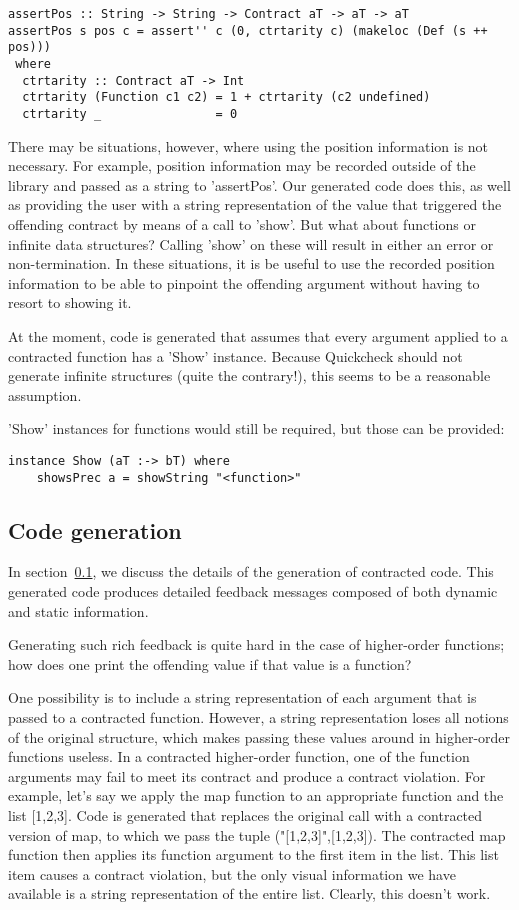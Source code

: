 \documentclass[10pt,a4paper]{article}
\begin{document}
\begin{lstlisting}
assertPos :: String -> String -> Contract aT -> aT -> aT
assertPos s pos c = assert'' c (0, ctrtarity c) (makeloc (Def (s ++ pos)))
 where
  ctrtarity :: Contract aT -> Int
  ctrtarity (Function c1 c2) = 1 + ctrtarity (c2 undefined)
  ctrtarity _                = 0
\end{lstlisting}

There may be situations, however, where using the position information is not necessary.
For example, position information may be recorded outside of the library and passed as a string to 'assertPos'.
Our generated code does this, as well as providing the user with a string representation of the value that triggered the offending contract by means of a call to 'show'.
But what about functions or infinite data structures? Calling 'show' on these will result in either an error or non-termination.
In these situations, it is be useful to use the recorded position information to be able to pinpoint the offending argument without having to resort to showing it.

At the moment, code is generated that assumes that every argument applied to a contracted function has a 'Show' instance. Because Quickcheck should not generate infinite structures (quite the contrary!), this seems to be a reasonable assumption.

'Show' instances for functions would still be required, but those can be provided:

\begin{lstlisting}
instance Show (aT :-> bT) where
	showsPrec a = showString "<function>"
\end{lstlisting}

\subsection{Code generation}
\label{codegeneration}

In section~\ref{codegeneration}, we discuss the details of the generation of contracted code.
This generated code produces detailed feedback messages composed of both dynamic and static information.

Generating such rich feedback is quite hard in the case of higher-order functions; how does one print the offending value if that value is a function?

One possibility is to include a string representation of each argument that is passed to a contracted function.
However, a string representation loses all notions of the original structure, which makes passing these values around in higher-order functions useless.
In a contracted higher-order function, one of the function arguments may fail to meet its contract and produce a contract violation.
For example, let's say we apply the map function to an appropriate function and the list [1,2,3].
Code is generated that replaces the original call with a contracted version of map, to which we pass the tuple ("[1,2,3]",[1,2,3]).
The contracted map function then applies its function argument to the first item in the list.
This list item causes a contract violation, but the only visual information we have available is a string representation of the entire list.
Clearly, this doesn't work.
\end{document}
